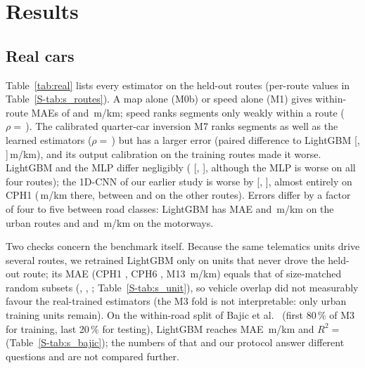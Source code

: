 \section{Results}
\label{sec:results}



\subsection{Real cars}
\label{sec:res_real}
Table~\ref{tab:real} lists every estimator on the held-out routes (per-route values in Table~\ref{S-tab:s_routes}).
A map alone (M0b) or speed alone (M1) gives within-route MAEs of \vrMapMaeWithin{} and \vrSpeedMaeWithin\,m/km; speed ranks segments only weakly within a route ($\rho=$\,\vrSpeedRhoWithin).
The calibrated quarter-car inversion M7 ranks segments as well as the learned estimators ($\rho=$\,\vrInvRhoWithin) but has a larger error (paired difference to LightGBM \vrInvDfive{} [\vrInvDfiveLo, \vrInvDfiveHi]\,m/km), and its output calibration on the training routes made it worse.
LightGBM and the MLP differ negligibly (\vrMlpDfive{} [\vrMlpDfiveLo, \vrMlpDfiveHi], although the MLP is worse on all four routes); the 1D-CNN of our earlier study is worse by \vrCnnDfive{} [\vrCnnDfiveLo, \vrCnnDfiveHi], almost entirely on CPH1 (\vrCnnDeficitCphOne\,m/km there, between \vrCnnDeficitCphSix{} and \vrCnnDeficitMwThree{} on the other routes).
Errors differ by a factor of four to five between road classes: LightGBM has MAE \vrGbmMaeCphOne{} and \vrGbmMaeCphSix\,m/km on the urban routes and \vrGbmMaeMwThree{} and \vrGbmMaeMwThirteen\,m/km on the motorways.

Two checks concern the benchmark itself.
Because the same telematics units drive several routes, we retrained LightGBM only on units that never drove the held-out route; its MAE (CPH1 \udCphOneDis, CPH6 \udCphSixDis, M13 \udMwThirteenDis\,m/km) equals that of size-matched random subsets (\udCphOneCtrl, \udCphSixCtrl, \udMwThirteenCtrl; Table~\ref{S-tab:s_unit}), so vehicle overlap did not measurably favour the real-trained estimators (the M3 fold is not interpretable: only urban training units remain).
On the within-road split of Bajic et al.~\cite{bajic2021ml} (first 80\,\% of M3 for training, last 20\,\% for testing), LightGBM reaches MAE \bjGbmMae\,m/km and $R^2=$\,\bjGbmRtwo{} (Table~\ref{S-tab:s_bajic}); the numbers of that and our protocol answer different questions and are not compared further.

